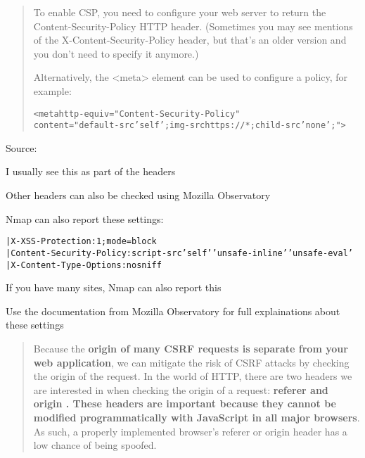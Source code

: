 \documentclass[Screen16to9,17pt]{foils}
\begin{document}


\begin{quote}
To enable CSP, you need to configure your web server to return the Content-Security-Policy HTTP header. (Sometimes you may see mentions of the X-Content-Security-Policy header, but that's an older version and you don't need to specify it anymore.)

Alternatively, the <meta> element can be used to configure a policy, for example:

\begin{alltt}
<meta http-equiv="Content-Security-Policy"
      content="default-src 'self'; img-src https://*; child-src 'none';">
\end{alltt}
\end{quote}
Source: 

\begin{list2}
\item I usually see this as part of the headers
\item Other headers can also be checked using Mozilla Observatory
\end{list2}



Nmap can also report these settings:
\begin{alltt}
|     X-XSS-Protection: 1;mode=block
|     Content-Security-Policy: script-src 'self' 'unsafe-inline' 'unsafe-eval'
|     X-Content-Type-Options: nosniff
\end{alltt}

\begin{list2}
\item If you have many sites, Nmap can also report this
\item Use the documentation from Mozilla Observatory for full explainations about these settings
\end{list2}




\begin{quote}
Because the {\bf origin of many CSRF requests is separate from your web application}, we can mitigate the risk of CSRF attacks by checking the origin of the request. In the world of HTTP, there are two headers we are interested in when checking the origin of a request: {\bf referer and origin . These headers are important because they cannot be modified programmatically with JavaScript in all major browsers}. As such, a properly implemented browser’s referer or origin header has a low chance of being spoofed.
\end{quote}
\end{document}
